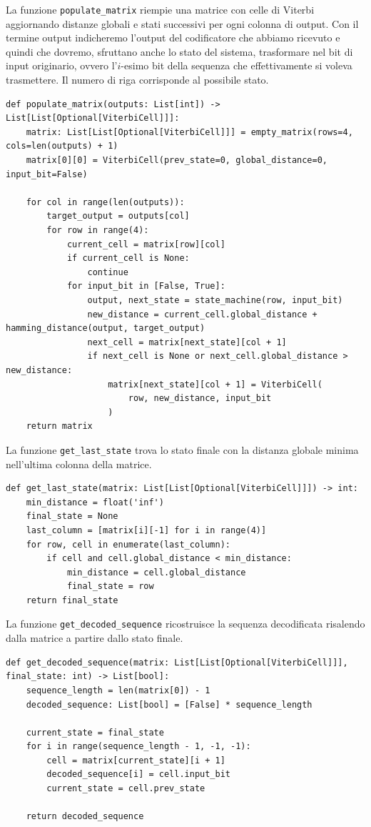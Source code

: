 La funzione \texttt{populate\_matrix} riempie una matrice con celle di Viterbi aggiornando distanze globali e stati successivi per ogni colonna di output. Con il termine output indicheremo l'output del codificatore che abbiamo ricevuto e quindi che dovremo, sfruttano anche lo stato del sistema, trasformare nel bit di input originario, ovvero l'$i$-esimo bit della sequenza che effettivamente si voleva trasmettere. Il numero di riga corrisponde al possibile stato.
\begin{verbatim}
def populate_matrix(outputs: List[int]) -> List[List[Optional[ViterbiCell]]]:
    matrix: List[List[Optional[ViterbiCell]]] = empty_matrix(rows=4, cols=len(outputs) + 1)
    matrix[0][0] = ViterbiCell(prev_state=0, global_distance=0, input_bit=False)

    for col in range(len(outputs)):
        target_output = outputs[col]
        for row in range(4):
            current_cell = matrix[row][col]
            if current_cell is None:
                continue
            for input_bit in [False, True]:
                output, next_state = state_machine(row, input_bit)
                new_distance = current_cell.global_distance + hamming_distance(output, target_output)
                next_cell = matrix[next_state][col + 1]
                if next_cell is None or next_cell.global_distance > new_distance:
                    matrix[next_state][col + 1] = ViterbiCell(
                        row, new_distance, input_bit
                    )
    return matrix
\end{verbatim}

La funzione \texttt{get\_last\_state} trova lo stato finale con la distanza globale minima nell'ultima colonna della matrice.
\begin{verbatim}
def get_last_state(matrix: List[List[Optional[ViterbiCell]]]) -> int:
    min_distance = float('inf')
    final_state = None
    last_column = [matrix[i][-1] for i in range(4)]
    for row, cell in enumerate(last_column):
        if cell and cell.global_distance < min_distance:
            min_distance = cell.global_distance
            final_state = row
    return final_state
\end{verbatim}
La funzione \texttt{get\_decoded\_sequence} ricostruisce la sequenza decodificata risalendo dalla matrice a partire dallo stato finale.
\begin{verbatim}
def get_decoded_sequence(matrix: List[List[Optional[ViterbiCell]]], final_state: int) -> List[bool]:
    sequence_length = len(matrix[0]) - 1
    decoded_sequence: List[bool] = [False] * sequence_length
    
    current_state = final_state
    for i in range(sequence_length - 1, -1, -1):
        cell = matrix[current_state][i + 1]
        decoded_sequence[i] = cell.input_bit
        current_state = cell.prev_state

    return decoded_sequence
\end{verbatim}


